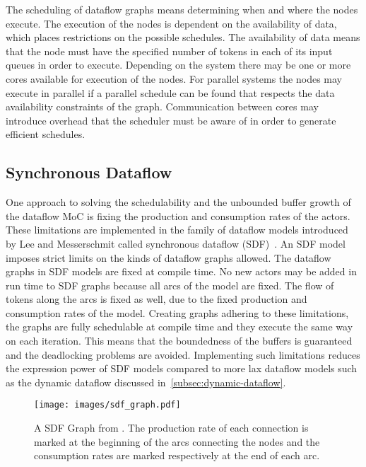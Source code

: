 The scheduling of dataflow graphs means determining when and where the nodes execute. The execution of the nodes is dependent on the availability of data, which places restrictions on the possible schedules. The availability of data means that the node must have the specified number of tokens in each of its input queues in order to execute. Depending on the system there may be one or more cores available for execution of the nodes. For parallel systems the nodes may execute in parallel if a parallel schedule can be found that respects the data availability constraints of the graph. Communication between cores may introduce overhead that the scheduler must be aware of in order to generate efficient schedules.~\cite{lee1987synchronous}

\subsection{Synchronous Dataflow}
\label{subsec:synchronous-dataflow}
\FloatBarrier
One approach to solving the schedulability and the unbounded buffer growth of the dataflow MoC is fixing the production and consumption rates of the actors. These limitations are implemented in the family of dataflow models introduced by Lee and Messerschmit called synchronous dataflow (SDF)~\cite{lee1987synchronous}. An SDF model imposes strict limits on the kinds of dataflow graphs allowed. The dataflow graphs in SDF models are fixed at compile time. No new actors may be added in run time to SDF graphs because all arcs of the model are fixed. The flow of tokens along the arcs is fixed as well, due to the fixed production and consumption rates of the model. Creating graphs adhering to these limitations, the graphs are fully schedulable at compile time and they execute the same way on each iteration. This means that the boundedness of the buffers is guaranteed and the deadlocking problems are avoided. Implementing such limitations reduces the expression power of SDF models compared to more lax dataflow models such as the dynamic dataflow discussed in~\ref{subsec:dynamic-dataflow}.~\cite{lee2015introduction}

\begin{figure}[h!]
    \begin{center}
        \texttt{[image: images/sdf\_graph.pdf]}
        \caption{A SDF Graph from \cite{ade1997data}. The production rate of each connection is marked at the beginning of the arcs connecting the nodes and the consumption rates are marked respectively at the end of each arc.}
        \label{fig:sdf_graph}
    \end{center}
\end{figure}

